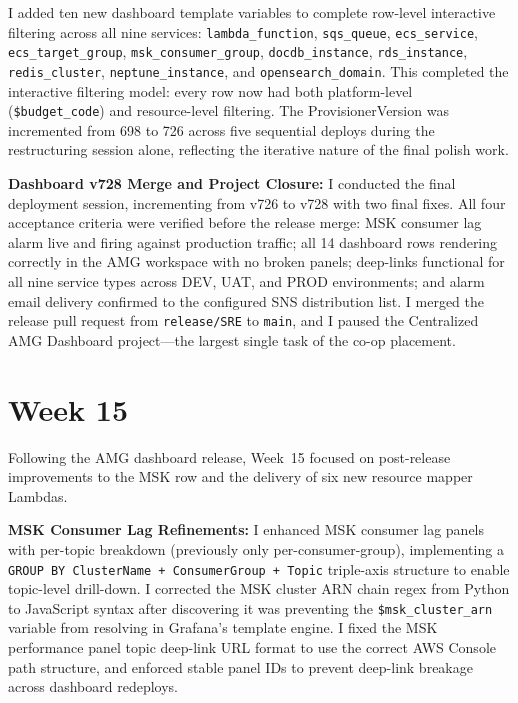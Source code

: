 I added ten new dashboard template variables to complete row-level interactive filtering across all nine services: \texttt{lambda\_function}, \texttt{sqs\_queue}, \texttt{ecs\_service}, \texttt{ecs\_target\_group}, \texttt{msk\_consumer\_group}, \texttt{docdb\_instance}, \texttt{rds\_instance}, \texttt{redis\_cluster}, \texttt{neptune\_instance}, and \texttt{opensearch\_domain}. This completed the interactive filtering model: every row now had both platform-level (\texttt{\$budget\_code}) and resource-level filtering. The ProvisionerVersion was incremented from 698 to 726 across five sequential deploys during the restructuring session alone, reflecting the iterative nature of the final polish work.

\textbf{Dashboard v728 Merge and Project Closure:} 
I conducted the final deployment session, incrementing from v726 to v728 with two final fixes. All four acceptance criteria were verified before the release merge: MSK consumer lag alarm live and firing against production traffic; all 14 dashboard rows rendering correctly in the AMG workspace with no broken panels; deep-links functional for all nine service types across DEV, UAT, and PROD environments; and alarm email delivery confirmed to the configured SNS distribution list. I merged the release pull request from \texttt{release/SRE} to \texttt{main}, and I paused the Centralized AMG Dashboard project---the largest single task of the co-op placement.


\FloatBarrier

\section{Week 15}
\label{sec:week15}

Following the AMG dashboard release, Week~15 focused on post-release improvements
to the MSK row and the delivery of six new resource mapper Lambdas.

\textbf{MSK Consumer Lag Refinements:} 
I enhanced MSK consumer lag panels with per-topic breakdown
(previously only per-consumer-group), implementing a
\texttt{GROUP BY ClusterName + ConsumerGroup + Topic} triple-axis
structure to enable topic-level drill-down. I corrected the MSK
cluster ARN chain regex from Python to JavaScript syntax
after discovering it was preventing the \texttt{\$msk\_cluster\_arn}
variable from resolving in Grafana's template engine. I fixed the MSK performance
panel topic deep-link URL format to use the correct AWS Console
path structure, and enforced stable panel IDs to prevent deep-link
breakage across dashboard redeploys.

